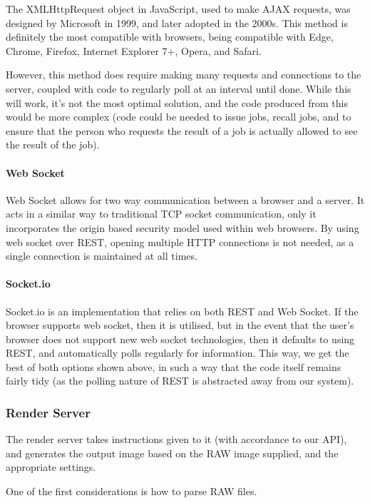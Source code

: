 \documentclass[12pt,a4paper]{article}
\begin{document}
The XMLHttpRequest object in JavaScript, used to make AJAX requests, was designed by Microsoft
in 1999, and later adopted in the 2000s.
This method is definitely the most compatible with browsers, being compatible with Edge, Chrome,
Firefox, Internet Explorer 7+, Opera, and Safari. \cite{XMLHttpRequestMozilla}

However, this method does require making many requests and connections to the server,
coupled with code to regularly poll at an interval until done. While this will work, it's not the most
optimal solution, and the code produced from this would be more complex (code could be needed to issue jobs, recall jobs,
and to ensure that the person who requests the result of a job is actually allowed to see the result of the job).

\paragraph{Web Socket}
Web Socket allows for two way communication between a browser and a server. It acts in a similar
way to traditional TCP socket communication, only it incorporates the origin based security
model used within web browsers. By using web socket over REST, opening multiple HTTP connections
is not needed, as a single connection is maintained at all times. \cite{WebSocketProtocol}

\paragraph{Socket.io}
Socket.io is an implementation that relies on both REST and Web Socket.
If the browser supports web socket, then it is utilised, but in the event that the
user's browser does not support new web socket technologies, then it defaults to
using REST, and automatically polls regularly for information. This way, we get the
best of both options shown above, in such a way that the code itself remains fairly
tidy (as the polling nature of REST is abstracted away from our system).

\subsubsection{Render Server}
The render server takes instructions given to it (with accordance to our API), and
generates the output image based on the RAW image supplied, and the appropriate settings.

One of the first considerations is how to parse RAW files.
\end{document}
